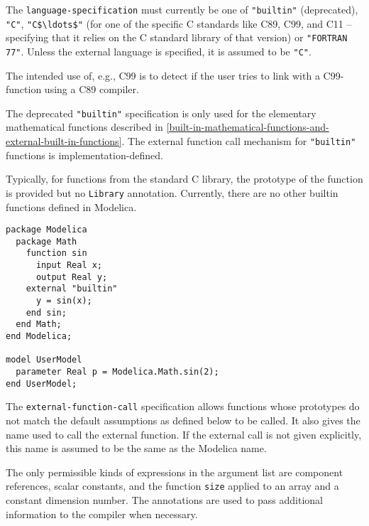 The {\lstinline[language=grammar]!language-specification!} must currently be one of {\lstinline!"builtin"!} (deprecated), {\lstinline!"C"!}, {\lstinline!"C$\ldots$"!} (for one of the specific C standards like C89, C99, and C11 -- specifying
that it relies on the C standard library of that version) or {\lstinline!"FORTRAN 77"!}.
Unless the external language is specified, it is assumed to be {\lstinline!"C"!}.

\begin{nonnormative}
The intended use of, e.g., C99 is to detect if the user tries to link with a C99-function using a C89 compiler.
\end{nonnormative}

The deprecated {\lstinline!"builtin"!} specification is only used for the elementary mathematical functions described in \cref{built-in-mathematical-functions-and-external-built-in-functions}.
The external function call mechanism for {\lstinline!"builtin"!} functions is implementation-defined.

\begin{nonnormative}
Typically, for functions from the standard C library, the prototype of the function is provided but no {\lstinline!Library!} annotation.  Currently, there are no other builtin functions defined in Modelica.
\end{nonnormative}

\begin{example}
\begin{lstlisting}[language=modelica]
package Modelica
  package Math
    function sin
      input Real x;
      output Real y;
    external "builtin"
      y = sin(x);
    end sin;
  end Math;
end Modelica;

model UserModel
  parameter Real p = Modelica.Math.sin(2);
end UserModel;
\end{lstlisting}
\end{example}

The {\lstinline[language=grammar]!external-function-call!} specification allows functions whose prototypes do not match the default assumptions as defined below to be called.  It also gives the name used to call the external function.  If the external call is not given explicitly, this name is assumed to be the same as the Modelica name.

The only permissible kinds of expressions in the argument list are component references, scalar constants, and the function {\lstinline!size!} applied to an array and a constant dimension number.
The annotations are used to pass additional information to the compiler when necessary.

